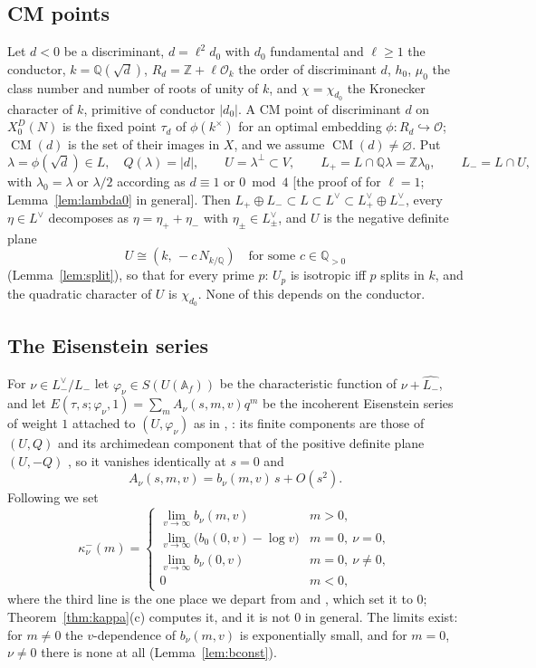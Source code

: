 \documentclass[11pt,reqno]{amsart}
\theoremstyle{plain}
\theoremstyle{definition}
\DeclareMathOperator{\CM}{CM}
\newcommand{\Q}{\mathbb{Q}}
\newcommand{\Z}{\mathbb{Z}}
\newcommand{\A}{\mathbb{A}}
\newcommand{\Ldual}{L^{\vee}}
\newcommand{\Lm}{L_{-}}
\newcommand{\Lp}{L_{+}}
\newcommand{\parentref}[1]{\textup{[#1]}}
\begin{document}
\subsection*{CM points}
Let $d<0$ be a discriminant, $d=\ell^2d_0$ with $d_0$ fundamental and $\ell\ge1$ the conductor,
$k=\Q(\sqrt d)$, $R_d=\Z+\ell\mathcal O_k$ the order of discriminant $d$, $h_0$, $\mu_0$ the class
number and number of roots of unity of $k$, and $\chi=\chi_{d_0}$ the Kronecker character of $k$,
primitive of conductor $|d_0|$. A CM point of discriminant $d$ on $X_0^D(N)$ is the fixed point
$\tau_d$ of $\phi(k^\times)$ for an optimal embedding $\phi:R_d\hookrightarrow\mathcal O$; $\CM(d)$
is the set of their images in $X$, and we assume $\CM(d)\neq\varnothing$. Put
\[
  \lambda=\phi(\sqrt d)\in L,\quad Q(\lambda)=|d|,\qquad U=\lambda^\perp\subset V,\qquad
  \Lp=L\cap\Q\lambda=\Z\lambda_0,\qquad \Lm=L\cap U,
\]
with $\lambda_0=\lambda$ or $\lambda/2$ according as $d\equiv1$ or $0\bmod4$
\parentref{the proof of \cite[Lemma~18]{Yang} for $\ell=1$; Lemma~\ref{lem:lambda0} in general}.
Then $\Lp\oplus\Lm\subset L\subset\Ldual\subset\Lp^\vee\oplus\Lm^\vee$, every $\eta\in\Ldual$
decomposes as $\eta=\eta_++\eta_-$ with $\eta_\pm\in L_\pm^\vee$, and $U$ is the negative definite
plane
\begin{equation}\label{eq:U}
  U\cong(k,\,-c\,N_{k/\Q})\quad\text{for some }c\in\Q_{>0}
\end{equation}
(Lemma~\ref{lem:split}), so that for every prime $p$: $U_p$ is isotropic iff $p$ splits in $k$, and
the quadratic character of $U$ is $\chi_{d_0}$. None of this depends on the conductor.

\subsection*{The Eisenstein series}
For $\nu\in\Lm^\vee/\Lm$ let $\varphi_\nu\in S(U(\A_f))$ be the characteristic function of
$\nu+\widehat{\Lm}$, and let $E(\tau,s;\varphi_\nu,1)=\sum_mA_\nu(s,m,v)q^m$ be the incoherent
Eisenstein series of weight $1$ attached to $(U,\varphi_\nu)$ as in \cite[\S4]{Yang},
\cite[\S2]{Schofer}: its finite components are those of $(U,Q)$ and its archimedean component
that of the positive definite plane $(U,-Q)$ \cite[after (2.18)]{BY}, so it vanishes identically
at $s=0$ and
\[
  A_\nu(s,m,v)=b_\nu(m,v)\,s+O(s^2).
\]
Following \cite[(11)]{Yang} we set
\begin{equation}\label{eq:kappaminus}
  \kappa^-_\nu(m)=\begin{cases}\lim_{v\to\infty}b_\nu(m,v)&m>0,\\
  \lim_{v\to\infty}\bigl(b_0(0,v)-\log v\bigr)&m=0,\ \nu=0,\\
  \lim_{v\to\infty}b_\nu(0,v)&m=0,\ \nu\neq0,\\ 0&m<0,\end{cases}
\end{equation}
where the third line is the one place we depart from \cite{Yang} and \cite[Lemma~2.21]{Schofer},
which set it to $0$; Theorem~\ref{thm:kappa}(c) computes it, and it is not $0$ in general. The
limits exist: for $m\neq0$ the $v$-dependence of $b_\nu(m,v)$ is exponentially small, and for
$m=0$, $\nu\neq0$ there is none at all (Lemma~\ref{lem:bconst}).
\end{document}
